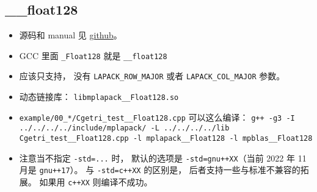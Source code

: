 
\begin{issues}
\issueDraft
\end{issues}


\subsection{\_\_float128}
\begin{itemize}
\item 源码和 manual 见 \href{https://github.com/nakatamaho/mplapack}{github}。
\item GCC 里面 \verb|_Float128| 就是 \verb|__float128|
\item 应该只支持， 没有 \verb|LAPACK_ROW_MAJOR| 或者 \verb|LAPACK_COL_MAJOR| 参数。
\item 动态链接库： \verb|libmplapack__Float128.so|
\item \verb|example/00_*/Cgetri_test__Float128.cpp| 可以这么编译： \verb|g++ -g3 -I ../../../../include/mplapack/ -L ../../../../lib Cgetri_test__Float128.cpp -l mplapack__Float128 -l mpblas__Float128|
\item 注意当不指定 \verb|-std=...| 时， 默认的选项是 \verb|-std=gnu++XX|（当前 2022 年 11 月是 \verb|gnu++17|）。 与 \verb|-std=c++XX| 的区别是， 后者支持一些与标准不兼容的拓展。 如果用 \verb|c++XX| 则编译不成功。
\end{itemize}

